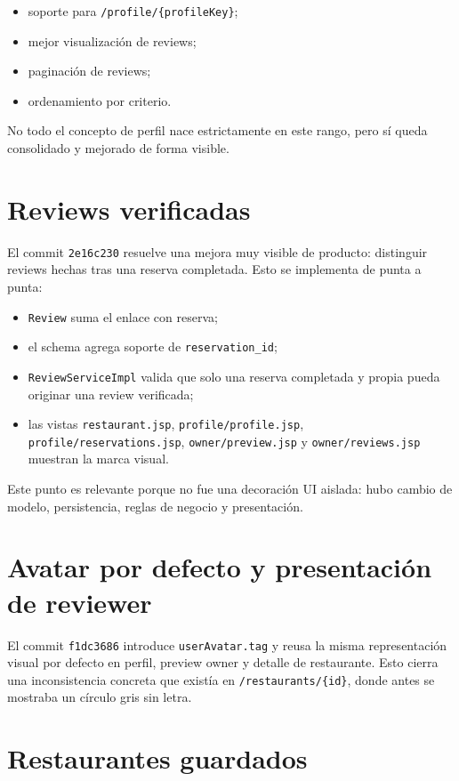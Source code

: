 \documentclass[11pt,a4paper]{report}
\newcommand{\commit}[1]{\texttt{#1}}
\newcommand{\code}[1]{\nolinkurl{#1}}
\begin{document}
\begin{itemize}
  \item soporte para \code{/profile/\{profileKey\}};
  \item mejor visualizaci\'on de reviews;
  \item paginaci\'on de reviews;
  \item ordenamiento por criterio.
\end{itemize}

No todo el concepto de perfil nace estrictamente en este rango, pero s\'i queda consolidado y mejorado de forma visible.

\section{Reviews verificadas}

El commit \commit{2e16c230} resuelve una mejora muy visible de producto: distinguir reviews hechas tras una reserva completada. Esto se implementa de punta a punta:

\begin{itemize}
  \item \code{Review} suma el enlace con reserva;
  \item el schema agrega soporte de \code{reservation\_id};
  \item \code{ReviewServiceImpl} valida que solo una reserva completada y propia pueda originar una review verificada;
  \item las vistas \code{restaurant.jsp}, \code{profile/profile.jsp}, \code{profile/reservations.jsp}, \code{owner/preview.jsp} y \code{owner/reviews.jsp} muestran la marca visual.
\end{itemize}

Este punto es relevante porque no fue una decoraci\'on UI aislada: hubo cambio de modelo, persistencia, reglas de negocio y presentaci\'on.

\section{Avatar por defecto y presentaci\'on de reviewer}

El commit \commit{f1dc3686} introduce \code{userAvatar.tag} y reusa la misma representaci\'on visual por defecto en perfil, preview owner y detalle de restaurante. Esto cierra una inconsistencia concreta que exist\'ia en \code{/restaurants/\{id\}}, donde antes se mostraba un c\'irculo gris sin letra.

\section{Restaurantes guardados}
\end{document}
